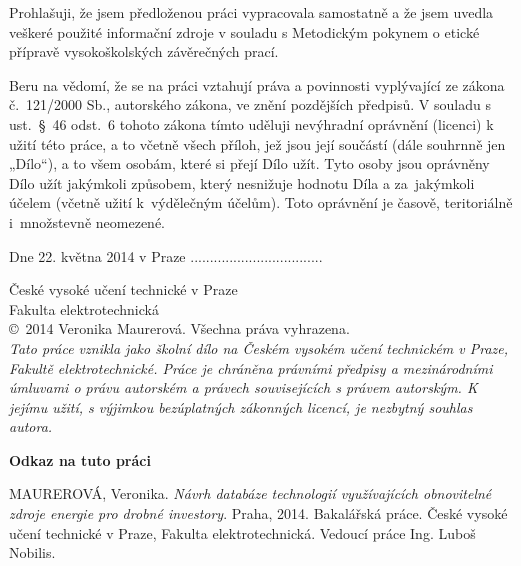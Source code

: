 \documentclass[11pt,a4paper]{article}
\begin{document}
\begin{large}
 \noindent Prohlašuji, že jsem předloženou práci vypracovala samostatně a že jsem uvedla veškeré použité informační zdroje v souladu s Metodickým pokynem o etické přípravě vysokoškolských závěrečných prací.

Beru na vědomí, že se na práci vztahují práva a povinnosti vyplývající ze zákona č.~121/2000 Sb., autorského zákona, ve znění pozdějších předpisů. V souladu s ust.~§~46 odst.~6 tohoto zákona tímto uděluji nevýhradní oprávnění (licenci) k užití této práce, a to včetně všech příloh, jež jsou její součástí (dále souhrnně jen „Dílo“), a to všem osobám, které si přejí Dílo užít. Tyto osoby jsou oprávněny Dílo užít jakýmkoli způsobem, který nesnižuje hodnotu Díla a za~jakýmkoli účelem (včetně užití k~výdělečným účelům). Toto oprávnění je časově, teritoriálně i~množstevně neomezené.

\vspace{2cm}

\noindent Dne 22. května 2014 v Praze \hspace{8cm} ..................................
\end{large}
\newpage

\thispagestyle{empty}
\vspace*{16cm}
\begin{large}
\noindent České vysoké učení technické v Praze\\
Fakulta elektrotechnická\\
\copyright~2014 Veronika Maurerová. Všechna práva vyhrazena.\\
\textit{Tato práce vznikla jako školní dílo na Českém vysokém učení technickém v Praze, Fakultě elektrotechnické. Práce je chráněna právními předpisy a mezinárodními úmluvami o právu autorském a právech souvisejících s právem autorským. K jejímu užití, s výjimkou bezúplatných zákonných licencí, je nezbytný souhlas autora.}\\
\end{large}

\vspace{0.5cm}
\thispagestyle{empty}
{\huge \noindent \textbf{Odkaz na tuto práci}}
\vspace*{1cm}

\noindent MAUREROVÁ, Veronika. \textit{Návrh databáze technologií využívajících obnovitelné zdroje energie pro drobné investory}. Praha, 2014. Bakalářská práce. České vysoké učení technické v Praze, Fakulta elektrotechnická. Vedoucí práce Ing. Luboš Nobilis. 
\end{document}
